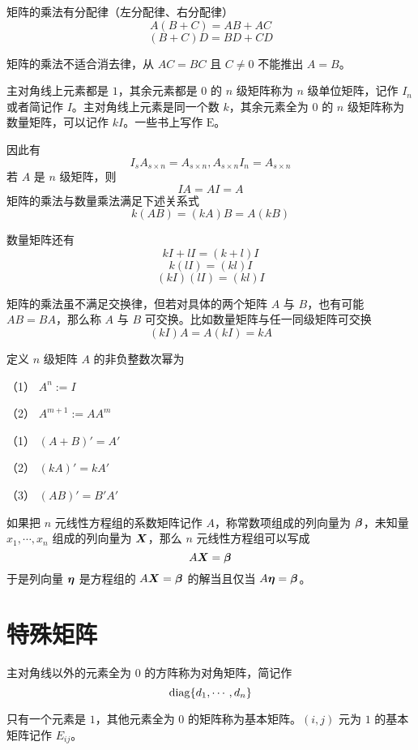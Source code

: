 \begin{theorem}
    矩阵的乘法有分配律（左分配律、右分配律）
    $$A(B+C) = AB+AC$$
    $$(B+C)D = BD + CD$$
\end{theorem}

矩阵的乘法不适合消去律，从 $AC = BC$ 且 $C\ne 0$ 不能推出 $A=B$。

主对角线上元素都是 $1$，其余元素都是 $0$ 的 $n$ 级矩阵称为 $n$ 级单位矩阵，记作 $I_n$ 或者简记作 $I$。主对角线上元素是同一个数 $k$，其余元素全为 $0$ 的 $n$ 级矩阵称为数量矩阵，可以记作 $kI$。一些书上写作 $\mathrm{E}$。

因此有
$$I_s A_{s\times n} = A_{s\times n}, A_{s\times n} I_n= A_{s\times n}$$
若 $A$ 是 $n$ 级矩阵，则
$$IA = AI = A$$
矩阵的乘法与数量乘法满足下述关系式
$$k(AB) = (kA)B = A(kB)$$

数量矩阵还有
$$kI + lI = (k+l)I$$
$$k(lI) = (kl)I$$
$$(kI)(lI) = (kl)I$$

矩阵的乘法虽不满足交换律，但若对具体的两个矩阵 $A$ 与 $B$，也有可能 $AB = BA$，那么称 $A$ 与 $B$ 可交换。比如数量矩阵与任一同级矩阵可交换
$$(kI)A = A(kI) = kA$$

\begin{definition}
    定义 $n$ 级矩阵 $A$ 的非负整数次幂为

    （1） $A^n := I$

    （2） $A^{m+1} := AA^m$
\end{definition}


\begin{theorem}
    （1） $(A+B)' = A'$
    
    （2） $(kA)' = kA'$
    
    （3） $(AB)' = B'A'$
\end{theorem}

如果把 $n$ 元线性方程组的系数矩阵记作 $A$，称常数项组成的列向量为 $\boldsymbol{\beta}$，未知量 $x_1,\cdots,x_n$ 组成的列向量为 $\boldsymbol{X}$，那么 $n$ 元线性方程组可以写成
$$A\boldsymbol{X} = \boldsymbol{\beta}$$
于是列向量 $\boldsymbol{\eta}$ 是方程组的 $A\boldsymbol{X} = \boldsymbol{\beta}$ 的解当且仅当 $A\boldsymbol{\eta} = \boldsymbol{\beta}$。

\section{特殊矩阵}

\begin{definition}
    主对角线以外的元素全为 $0$ 的方阵称为对角矩阵，简记作
    $$\operatorname{diag}\{d_1,\cdots,d_n\}$$
\end{definition}

\begin{definition}
    只有一个元素是 $1$，其他元素全为 $0$ 的矩阵称为基本矩阵。$(i,j)$ 元为 $1$ 的基本矩阵记作 $E_{ij}$。
\end{definition}

